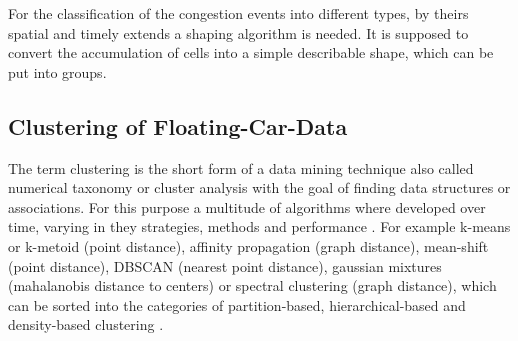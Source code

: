 For the classification of the congestion events into different types, by theirs spatial and timely extends a shaping algorithm is needed. It is supposed to convert the accumulation of cells into a simple describable shape, which can be put into groups.

\subsection{Clustering of Floating-Car-Data}
\label{methodology_detection_clustering}
The term clustering is the short form of a data mining technique also called numerical taxonomy or cluster analysis with the goal of finding data structures or associations. For this purpose a multitude of algorithms where developed over time, varying in they strategies, methods and performance \parencite{Busch2004}. For example k-means or k-metoid (point distance), affinity propagation (graph distance), mean-shift (point distance), DBSCAN (nearest point distance), gaussian mixtures (mahalanobis distance to centers) or spectral clustering (graph distance), which can be sorted into the categories of partition-based, hierarchical-based and density-based clustering \parencite{Chauhan2020,Yildirim2020}.


